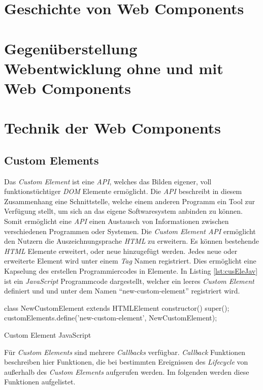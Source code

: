 \documentclass[12pt, paper=a4, bibtotoc, toc=listof]{scrreprt}
\begin{document}
		\section{Geschichte von Web Components}
		\section{Gegenüberstellung Webentwicklung ohne und mit Web Components}
		\section{Technik der Web Components}
			\subsection{Custom Elements}
			Das \emph{Custom Element} ist eine \emph{\ac{API}}, welches das Bilden eigener, voll funktionstüchtiger \emph{\ac{DOM}} Elemente ermöglicht. Die \emph{\ac{API}} beschreibt in diesem Zusammenhang eine Schnittstelle, welche einem anderen Programm ein Tool zur Verfügung stellt, um sich an das eigene Softwaresystem anbinden zu können. Somit ermöglicht eine \emph{\ac{API}} einen Austausch von Informationen zwischen verschiedenen Programmen oder Systemen.	
			Die \emph{Custom Element \ac{API}} ermöglicht den Nutzern die Auszeichnungsprache \emph{\ac{HTML}} zu erweitern. Es können bestehende \emph{\ac{HTML}} Elemente erweitert, oder neue hinzugefügt werden. Jedes neue oder erweiterte Element wird unter einem \emph{Tag} Namen registriert. Dies ermöglicht eine Kapselung des erstellen Programmiercodes in Elemente. In Listing \ref{lst:cusEleJav} ist ein \emph{JavaScript} Programmcode dargestellt, welcher ein leeres \emph{Custom Element} definiert und und unter dem Namen \enquote{new-custom-element} registriert wird.
			\begin{listing}
				\begin{JavaScriptcode*}{}
class NewCustomElement extends HTMLElement {
	constructor() {
		super();
	}
}
customElements.define('new-custom-element', NewCustomElement);
				\end{JavaScriptcode*}
				\caption{Custom Element JavaScript}
				\label{lst:cusEleJav}
			\end{listing}
			Für \emph{Custom Elements} sind mehrere \emph{Callbacks} verfügbar. \emph{Callback} Funktionen beschreiben hier Funktionen, die bei bestimmten Ereignissen des \emph{Lifecycle} von außerhalb des \emph{Custom Elements} aufgerufen werden. Im folgenden werden diese Funktionen aufgelistet.
\end{document}

